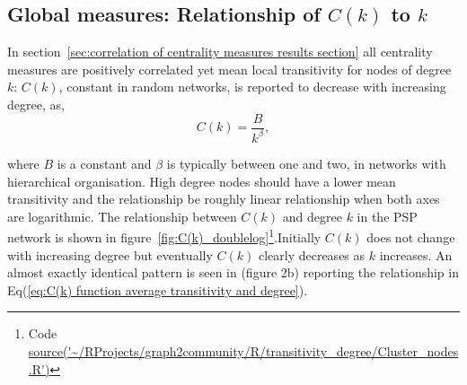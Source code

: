 














  

  
\subsection{Global measures: Relationship of $C(k)$ to $k$}%
\label{sec:relationship of ck to k albert}

In section~\ref{sec:correlation of centrality measures results section} all centrality measures are positively correlated yet mean local transitivity for nodes of degree $k$: $C(k)$, constant in random networks, is reported to decrease with increasing degree\cite{yook2004functional},\cite{albert2005scale} as,
\begin{equation}
            C(k) = \frac{B}{k^{\beta}},
\end{equation}
\label{eq:C(k) function average transitivity and degree}

 where $B$ is a constant and $\beta$ is typically between one and two\cite{albert2005scale},\cite{yook2004functional} in networks with hierarchical organisation. High degree nodes should have a lower mean transitivity and the relationship be roughly linear relationship when both axes are logarithmic. The relationship between $C(k)$ and degree $k$ in the PSP network  is shown in figure~\ref{fig:C(k)_doublelog}\footnote{Code \url{source('~/RProjects/graph2community/R/transitivity_degree/Cluster_nodes.R')}}.Initially $C(k)$ does not change with increasing degree but eventually $C(k)$ clearly decreases as $k$ increases. An almost exactly identical pattern is seen in\cite{yook2004functional}  (figure 2b) reporting the relationship in Eq(\ref{eq:C(k) function average transitivity and degree}). 

